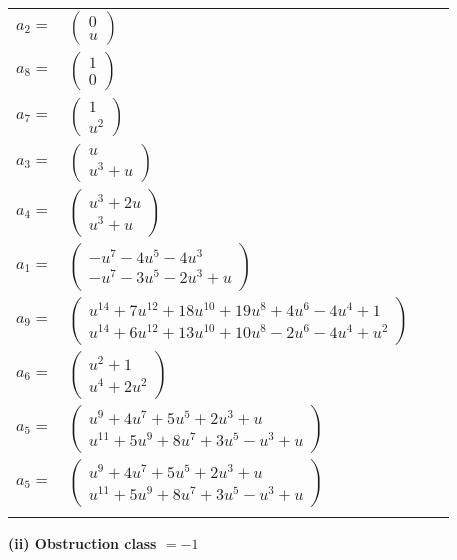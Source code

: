 \documentclass[1p]{elsarticle_modified}
\theoremstyle{definition}
\begin{document}
\begin{tabular}{m{7pt} m{180pt} m{7pt} m{180pt} }
\flushright $a_{2}=$&$\begin{pmatrix}0\\u\end{pmatrix}$ \\
\flushright $a_{8}=$&$\begin{pmatrix}1\\0\end{pmatrix}$ \\
\flushright $a_{7}=$&$\begin{pmatrix}1\\u^2\end{pmatrix}$ \\
\flushright $a_{3}=$&$\begin{pmatrix}u\\u^3+u\end{pmatrix}$ \\
\flushright $a_{4}=$&$\begin{pmatrix}u^3+2 u\\u^3+u\end{pmatrix}$ \\
\flushright $a_{1}=$&$\begin{pmatrix}- u^7-4 u^5-4 u^3\\- u^7-3 u^5-2 u^3+u\end{pmatrix}$ \\
\flushright $a_{9}=$&$\begin{pmatrix}u^{14}+7 u^{12}+18 u^{10}+19 u^8+4 u^6-4 u^4+1\\u^{14}+6 u^{12}+13 u^{10}+10 u^8-2 u^6-4 u^4+u^2\end{pmatrix}$ \\
\flushright $a_{6}=$&$\begin{pmatrix}u^2+1\\u^4+2 u^2\end{pmatrix}$ \\
\flushright $a_{5}=$&$\begin{pmatrix}u^9+4 u^7+5 u^5+2 u^3+u\\u^{11}+5 u^9+8 u^7+3 u^5- u^3+u\end{pmatrix}$\\ \flushright $a_{5}=$&$\begin{pmatrix}u^9+4 u^7+5 u^5+2 u^3+u\\u^{11}+5 u^9+8 u^7+3 u^5- u^3+u\end{pmatrix}$\\&\end{tabular}
\flushleft \textbf{(ii) Obstruction class $= -1$}\\~\\
\end{document}
